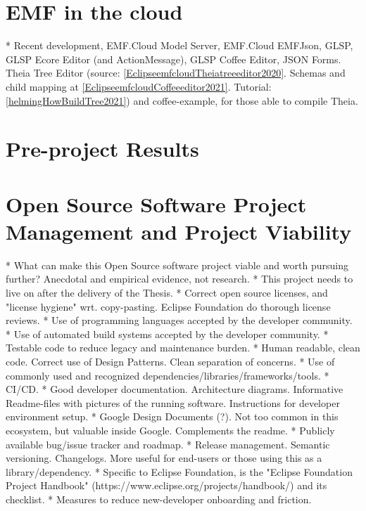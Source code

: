 


\section{\acrlong{EMF} in the \Gls{cloud}}\label{sec:emf-in-cloud}
* Recent development, EMF.Cloud Model Server, EMF.Cloud EMFJson, GLSP, GLSP Ecore Editor (and ActionMessage\label{par:glsp-actionmessage}), GLSP Coffee Editor, JSON Forms.
Theia Tree Editor\label{par:theia-tree-editor} (source: \cref{EclipseemfcloudTheiatreeeditor2020}. Schemas and child mapping at \cref{EclipseemfcloudCoffeeeditor2021}. Tutorial: \cref{helmingHowBuildTree2021}) and coffee-example, for those able to compile Theia.

\section{Pre-project Results}




\section{Open Source Software Project Management and Project Viability}

* What can make this Open Source software project viable and worth pursuing further? Anecdotal and empirical evidence, not research.
  * This project needs to live on after the delivery of the Thesis.
  * Correct open source licenses, and "license hygiene" wrt. copy-pasting. Eclipse Foundation do thorough license reviews.
  * Use of programming languages accepted by the developer community.
  * Use of automated build systems accepted by the developer community.
  * Testable code to reduce legacy and maintenance burden.
  * Human readable, clean code. Correct use of Design Patterns. Clean separation of concerns.
  * Use of commonly used and recognized dependencies/libraries/frameworks/tools.
  * CI/CD.
  * Good developer documentation. Architecture diagrams. Informative Readme-files with pictures of the running software. Instructions for developer environment setup.
  * Google Design Documents (?). Not too common in this ecosystem, but valuable inside Google. Complements the readme.
  * Publicly available bug/issue tracker and roadmap.
  * Release management. Semantic versioning. Changelogs. More useful for end-users or those using this as a library/dependency.
  * Specific to Eclipse Foundation, is the "Eclipse Foundation Project Handbook" (https://www.eclipse.org/projects/handbook/) and its checklist.
  * Measures to reduce new-developer onboarding and friction.
